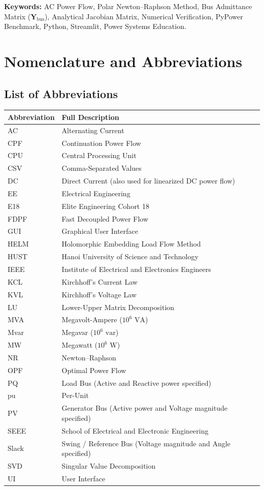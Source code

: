 \documentclass[12pt,a4paper,oneside]{report}
\begin{document}
\vspace{15pt}
\noindent \textbf{Keywords:} AC Power Flow, Polar Newton--Raphson Method, Bus Admittance Matrix ($\mathbf{Y}_{\text{bus}}$), Analytical Jacobian Matrix, Numerical Verification, PyPower Benchmark, Python, Streamlit, Power Systems Education.

\clearpage

\chapter*{Nomenclature and Abbreviations}

\section*{List of Abbreviations}
\begin{longtable}{ll}
\toprule
\textbf{Abbreviation} & \textbf{Full Description} \\
\midrule
AC & Alternating Current \\
CPF & Continuation Power Flow \\
CPU & Central Processing Unit \\
CSV & Comma-Separated Values \\
DC & Direct Current (also used for linearized DC power flow) \\
EE & Electrical Engineering \\
E18 & Elite Engineering Cohort 18 \\
FDPF & Fast Decoupled Power Flow \\
GUI & Graphical User Interface \\
HELM & Holomorphic Embedding Load Flow Method \\
HUST & Hanoi University of Science and Technology \\
IEEE & Institute of Electrical and Electronics Engineers \\
KCL & Kirchhoff's Current Law \\
KVL & Kirchhoff's Voltage Law \\
LU & Lower-Upper Matrix Decomposition \\
MVA & Megavolt-Ampere ($10^6\text{ VA}$) \\
Mvar & Megavar ($10^6\text{ var}$) \\
MW & Megawatt ($10^6\text{ W}$) \\
NR & Newton--Raphson \\
OPF & Optimal Power Flow \\
PQ & Load Bus (Active and Reactive power specified) \\
pu & Per-Unit \\
PV & Generator Bus (Active power and Voltage magnitude specified) \\
SEEE & School of Electrical and Electronic Engineering \\
Slack & Swing / Reference Bus (Voltage magnitude and Angle specified) \\
SVD & Singular Value Decomposition \\
UI & User Interface \\
\bottomrule
\end{longtable}
\end{document}
